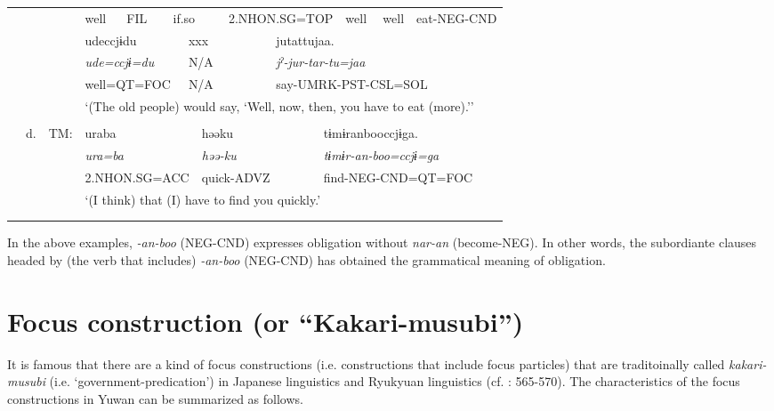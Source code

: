\begin{tabularx}{\textwidth}{XXXXXXXXXXXXXXXXXXX}
&  &  & { well} & \multicolumn{3}{X}{{ FIL}} & \multicolumn{3}{X}{{ if.so}} & \multicolumn{3}{X}{{ 2.NHON.SG=TOP}} & \multicolumn{3}{X}{{ well}} & \multicolumn{2}{X}{{ well}} & { eat-NEG-CND}\\
&  &  & \multicolumn{5}{X}{{ udeccjɨdu}} & \multicolumn{3}{X}{{ xxx}} & \multicolumn{8}{X}{{ jutattujaa.}}\\
&  &  & \multicolumn{5}{X}{{\itshape ude=ccjɨ=du}} & \multicolumn{3}{X}{{ N/A}} & \multicolumn{8}{X}{{\itshape jˀ-jur-tar-tu=jaa}}\\
&  &  & \multicolumn{5}{X}{{ well=QT=FOC}} & \multicolumn{3}{X}{{ N/A}} & \multicolumn{8}{X}{{ say-UMRK-PST-CSL=SOL}}\\
&  &  & \multicolumn{16}{X}{{ ‘(The old people) would say, ‘Well, now, then, you have to eat (more).’’}}\\
&  & \multicolumn{17}{X}{\raggedleft [Co: 120415\_01.txt]}\\
& { d.} & { TM:} & \multicolumn{6}{X}{{ uraba}} & \multicolumn{3}{X}{{ həəku}} & \multicolumn{7}{X}{{ tɨmɨranbooccjɨga.}}\\
&  &  & \multicolumn{6}{X}{{\itshape ura=ba}} & \multicolumn{3}{X}{{\itshape həə-ku}} & \multicolumn{7}{X}{{ \textit{tɨmɨr-an-boo=ccjɨ=ga}}}\\
&  &  & \multicolumn{6}{X}{{ 2.NHON.SG=ACC}} & \multicolumn{3}{X}{{ quick-ADVZ}} & \multicolumn{7}{X}{{ find-NEG-CND=QT=FOC}}\\
&  &  & \multicolumn{16}{X}{{ ‘(I think) that (I) have to find you quickly.’}}\\
&  &  & \multicolumn{16}{X}{\raggedleft [Co: 101023\_01.txt]}\\
\lspbottomrule
\end{tabularx}
In the above examples, \textit{{}-an-boo} (NEG-CND) expresses obligation without \textit{nar-an} (become-NEG). In other words, the subordiante clauses headed by (the verb that includes) \textit{{}-an-boo} (NEG-CND) has obtained the grammatical meaning of obligation.

\section{Focus construction (or “Kakari-musubi”)}
\label{bkm:Ref365192124}\hypertarget{RefHeadingToc395697261}{}
It is famous that there are a kind of focus constructions (i.e. constructions that include focus particles) that are traditoinally called \textit{kakari-musubi} (i.e. ‘government-predication’) in Japanese linguistics and Ryukyuan linguistics (cf. \citealt{Shimoji2008}: 565-570). The characteristics of the focus constructions in Yuwan can be summarized as follows.

